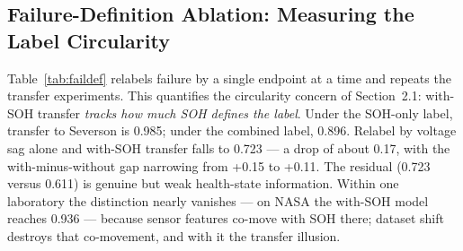 \documentclass[preprint,12pt]{elsarticle}
\begin{document}
\begin{table}[!t]
\caption{Factorial Feature Ablation at H=20 (XGBoost, Pooled AUC With Cell-Level Bootstrap 95\% CI). Feature Groups: SOH; Cycle Index; Sensors = Voltages, Current, Temperature, Duration.}
\label{tab:abl}
\centering
{}
\end{table}

\subsection{Failure-Definition Ablation: Measuring the Label Circularity}
Table~\ref{tab:faildef} relabels failure by a single endpoint at a time and repeats the transfer experiments. This quantifies the circularity concern of Section~2.1: with-SOH transfer \emph{tracks how much SOH defines the label}. Under the SOH-only label, transfer to Severson is 0.985; under the combined label, 0.896. Relabel by voltage sag alone and with-SOH transfer falls to 0.723 --- a drop of about 0.17, with the with-minus-without gap narrowing from +0.15 to +0.11. The residual (0.723 versus 0.611) is genuine but weak health-state information. Within one laboratory the distinction nearly vanishes --- on NASA the with-SOH model reaches 0.936 --- because sensor features co-move with SOH there; dataset shift destroys that co-movement, and with it the transfer illusion.
\end{document}
